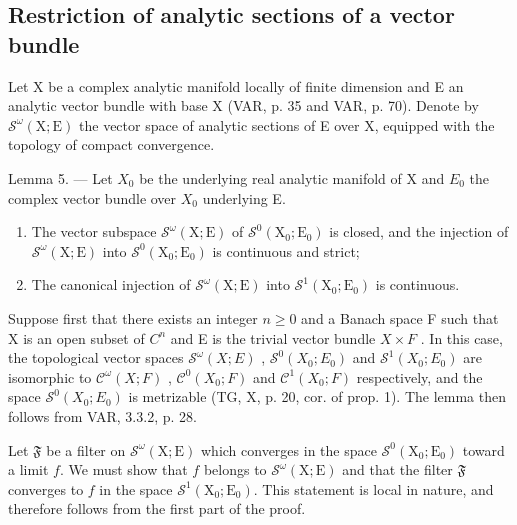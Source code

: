 \subsection{Restriction of analytic sections of a vector bundle}

Let X be a complex analytic manifold locally of finite dimension and E an analytic vector bundle with base X (VAR, p. 35 and VAR, p. 70). Denote by \(\mathcal{S}^{\omega}(\mathrm{X};\mathrm{E})\) the vector space of analytic sections of E over X, equipped with the topology of compact convergence.

Lemma 5. --- Let \(X_{0}\) be the underlying real analytic manifold of X and \(E_{0}\) the complex vector bundle over \(X_{0}\) underlying E.

\begin{enumerate}
\def\labelenumi{\alph{enumi})}
\item
  The vector subspace \(\mathcal{S}^{\omega}(\mathrm{X};\mathrm{E})\) of \(\mathcal{S}^{0}(\mathrm{X}_{0};\mathrm{E}_{0})\) is closed, and the injection of \(\mathcal{S}^{\omega}(\mathrm{X};\mathrm{E})\) into \(\mathcal{S}^{0}(\mathrm{X}_{0};\mathrm{E}_{0})\) is continuous and strict;
\item
  The canonical injection of \(\mathcal{S}^{\omega}(\mathrm{X};\mathrm{E})\) into \(\mathcal{S}^{1}(\mathrm{X}_{0};\mathrm{E}_{0})\) is continuous.
\end{enumerate}

Suppose first that there exists an integer \(n \geqslant 0\) and a Banach space F such that X is an open subset of \(C^{n}\) and E is the trivial vector bundle \(X \times F\) . In this case, the topological vector spaces \(\mathcal{S}^{\omega}(X;E)\) , \(\mathcal{S}^{0}(X_{0};E_{0})\) and \(\mathcal{S}^{1}(X_{0};E_{0})\) are isomorphic to \(\mathcal{C}^{\omega}(X;F)\) , \(\mathcal{C}^{0}(X_{0};F)\) and \(\mathcal{C}^{1}(X_{0};F)\) respectively, and the space \(\mathcal{S}^{0}(X_{0};E_{0})\) is metrizable (TG, X, p. 20, cor. of prop. 1). The lemma then follows from VAR, 3.3.2, p. 28.

Let \(\mathfrak{F}\) be a filter on \(\mathcal{S}^{\omega}(\mathrm{X};\mathrm{E})\) which converges in the space \(\mathcal{S}^{0}(\mathrm{X}_{0};\mathrm{E}_{0})\) toward a limit \(f\). We must show that \(f\) belongs to \(\mathcal{S}^{\omega}(\mathrm{X};\mathrm{E})\) and that the filter \(\mathfrak{F}\) converges to \(f\) in the space \(\mathcal{S}^{1}(\mathrm{X}_{0};\mathrm{E}_{0})\). This statement is local in nature, and therefore follows from the first part of the proof.

